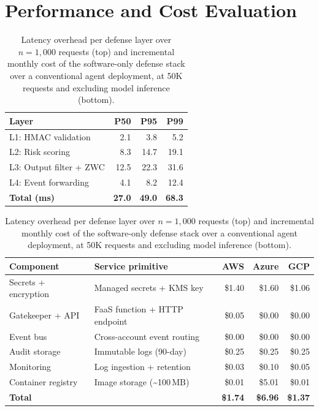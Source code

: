 \section{Performance and Cost Evaluation}
\label{sec:perf-cost}

\begin{table}[tb]
\caption{\label{tab:perf-cost}Latency overhead per defense layer over $n=1{,}000$ requests (top) and incremental monthly cost of the software-only defense stack over a conventional agent deployment, at 50K requests and excluding model inference (bottom).}
\centering
\scriptsize
\setlength{\tabcolsep}{4pt}
\begin{tabular}{@{}lrrr@{}}
\toprule
\textbf{Layer} & \textbf{P50} & \textbf{P95} & \textbf{P99} \\
\midrule
L1: HMAC validation     & 2.1  & 3.8  & 5.2 \\
L2: Risk scoring        & 8.3  & 14.7 & 19.1 \\
L3: Output filter + ZWC & 12.5 & 22.3 & 31.6 \\
L4: Event forwarding    & 4.1  & 8.2  & 12.4 \\
\midrule
\textbf{Total (ms)}     & \textbf{27.0} & \textbf{49.0} & \textbf{68.3} \\
\bottomrule
\end{tabular}

\vspace{1.2em}

\setlength{\tabcolsep}{2.5pt}
\begin{tabular}{@{}llrrr@{}}
\toprule
\textbf{Component} & \textbf{Service primitive} & \textbf{AWS} & \textbf{Azure} & \textbf{GCP} \\
\midrule
Secrets + encryption & Managed secrets + KMS key     & \$1.40 & \$1.60 & \$1.06 \\
Gatekeeper + API     & FaaS function + HTTP endpoint & \$0.05 & \$0.00 & \$0.00 \\
Event bus            & Cross-account event routing   & \$0.00 & \$0.00 & \$0.00 \\
Audit storage        & Immutable logs (90-day)       & \$0.25 & \$0.25 & \$0.25 \\
Monitoring           & Log ingestion + retention     & \$0.03 & \$0.10 & \$0.05 \\
Container registry   & Image storage (\textasciitilde100\,MB) & \$0.01 & \$5.01 & \$0.01 \\
\midrule
\textbf{Total}       &                               & \textbf{\$1.74} & \textbf{\$6.96} & \textbf{\$1.37} \\
\bottomrule
\end{tabular}
\end{table}

